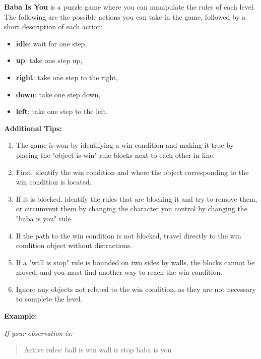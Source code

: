 \begin{GreenBox}[frametitle={\textbf{Iteration 1 Baba-is-ai Prompt}}]
\label{box:baba_is_you_iter_1}
\textbf{Baba Is You} is a puzzle game where you can manipulate the rules of each level. The following are the possible actions you can take in the game, followed by a short description of each action:

\begin{itemize}
    \item \textbf{idle}: wait for one step,
    \item \textbf{up}: take one step up,
    \item \textbf{right}: take one step to the right,
    \item \textbf{down}: take one step down,
    \item \textbf{left}: take one step to the left.
\end{itemize}

\textbf{Additional Tips:}
\begin{enumerate}
    \item The game is won by identifying a win condition and making it true by placing the "object is win" rule blocks next to each other in line.
    \item First, identify the win condition and where the object corresponding to the win condition is located.
    \item If it is blocked, identify the rules that are blocking it and try to remove them, or circumvent them by changing the character you control by changing the "baba is you" rule.
    \item If the path to the win condition is not blocked, travel directly to the win condition object without distractions.
    \item If a "wall is stop" rule is bounded on two sides by walls, the blocks cannot be moved, and you must find another way to reach the win condition.
    \item Ignore any objects not related to the win condition, as they are not necessary to complete the level.
\end{enumerate}

\textbf{Example:}

\textit{If your observation is:}
\begin{quote}
Active rules:  
ball is win  
wall is stop  
baba is you  


\end{quote}
\end{GreenBox}
